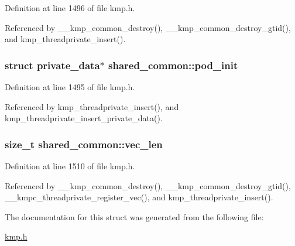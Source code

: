 Definition at line 1496 of file kmp.\-h.



Referenced by \-\_\-\-\_\-kmp\-\_\-common\-\_\-destroy(), \-\_\-\-\_\-kmp\-\_\-common\-\_\-destroy\-\_\-gtid(), and kmp\-\_\-threadprivate\-\_\-insert().

\hypertarget{structshared__common_a7609ddff99a7ccff444c4e1f2a7216e1}{
\subsubsection[{pod\-\_\-init}]{\setlength{\rightskip}{0pt plus 5cm}struct {\bf private\-\_\-data}$\ast$ shared\-\_\-common\-::pod\-\_\-init}}\label{structshared__common_a7609ddff99a7ccff444c4e1f2a7216e1}


Definition at line 1495 of file kmp.\-h.



Referenced by kmp\-\_\-threadprivate\-\_\-insert(), and kmp\-\_\-threadprivate\-\_\-insert\-\_\-private\-\_\-data().

\hypertarget{structshared__common_ae2761da4a704f4f2f377854538ba153c}{
\subsubsection[{vec\-\_\-len}]{\setlength{\rightskip}{0pt plus 5cm}size\-\_\-t shared\-\_\-common\-::vec\-\_\-len}}\label{structshared__common_ae2761da4a704f4f2f377854538ba153c}


Definition at line 1510 of file kmp.\-h.



Referenced by \-\_\-\-\_\-kmp\-\_\-common\-\_\-destroy(), \-\_\-\-\_\-kmp\-\_\-common\-\_\-destroy\-\_\-gtid(), \-\_\-\-\_\-kmpc\-\_\-threadprivate\-\_\-register\-\_\-vec(), and kmp\-\_\-threadprivate\-\_\-insert().



The documentation for this struct was generated from the following file\-:\begin{DoxyCompactItemize}
\item 
\hyperlink{kmp_8h}{kmp.\-h}\end{DoxyCompactItemize}
